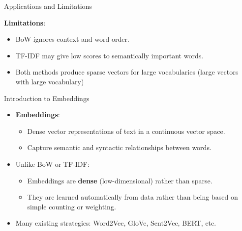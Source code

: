 \documentclass{beamer}
\begin{document}
\begin{frame}{Applications and Limitations}

        \textbf{Limitations}:
        \begin{itemize}
            \item BoW ignores context and word order.
            \item TF-IDF may give low scores to semantically important words.
            \item Both methods produce sparse vectors for large vocabularies (large vectors with large vocabulary)
        \end{itemize}


\end{frame}

\begin{frame}{Introduction to Embeddings}
    \begin{itemize}
        \item \textbf{Embeddings}:
        \begin{itemize}
            \item Dense vector representations of text in a continuous vector space.
            \item Capture semantic and syntactic relationships between words.
        \end{itemize}
        \item Unlike BoW or TF-IDF:
        \begin{itemize}
            \item Embeddings are \textbf{dense} (low-dimensional) rather than sparse.
            \item They are learned automatically from data rather than being based on simple counting or weighting.
        \end{itemize}
        \item Many existing strategies: Word2Vec, GloVe, Sent2Vec, BERT, etc.
    \end{itemize}
\end{frame}
\end{document}
